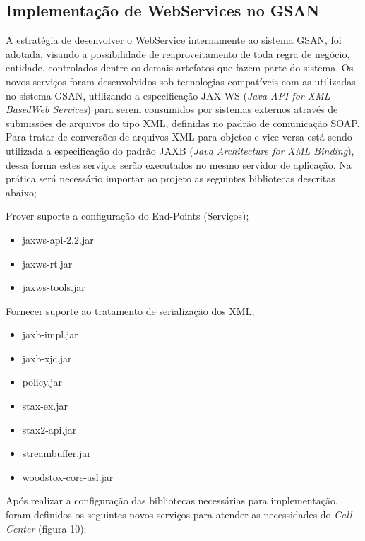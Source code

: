 \subsection{Implementação de WebServices no GSAN}

A estratégia de desenvolver o WebService internamente ao sistema GSAN, foi adotada, visando a possibilidade de reaproveitamento de toda regra de negócio, entidade, controlados dentre os demais artefatos que fazem parte do sistema.  Os novos serviços foram desenvolvidos sob tecnologias compatíveis com as utilizadas no sistema GSAN, utilizando a especificação JAX-WS (\textit{Java API for XML-BasedWeb Services}) para serem consumidos por sistemas externos através de submissões de arquivos do tipo XML, definidas no padrão de comunicação SOAP. Para tratar de conversões de arquivos XML para objetos e vice-versa está sendo utilizada a especificação do padrão JAXB (\textit{Java Architecture for XML Binding}), dessa forma estes serviços serão executados no mesmo servidor de aplicação.
Na prática será necessário importar ao projeto as seguintes bibliotecas descritas abaixo;

\begin{description}
	\item Prover suporte a configuração do End-Points (Serviços);
	\begin{itemize}
		\item jaxws-api-2.2.jar
		\item jaxws-rt.jar
		\item jaxws-tools.jar		
	\end{itemize}
	\item Fornecer suporte ao tratamento de serialização dos XML;
	\begin{itemize}
		\item jaxb-impl.jar
		\item jaxb-xjc.jar
		\item policy.jar
		\item stax-ex.jar
		\item stax2-api.jar
		\item streambuffer.jar
		\item woodstox-core-asl.jar		
	\end{itemize}
\end{description}

Após realizar a configuração das bibliotecas necessárias para implementação, foram definidos os seguintes novos serviços para atender as necessidades do \textit{Call Center} (figura 10):

